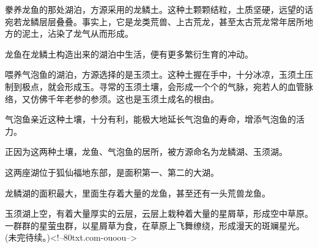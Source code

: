 \begin{this_body}
豢养龙鱼的那处湖泊，方源采用的龙鳞土。这种土颗颗结粒，土质坚硬，远望的话宛若龙鳞层层叠叠。事实上，它是龙类荒兽、上古荒龙，甚至太古荒龙常年居所地方的泥土，沾染了龙气从而形成。

龙鱼在龙鳞土构造出来的湖泊中生活，便有更多繁衍生育的冲动。

喂养气泡鱼的湖泊，方源选择的是玉须土。这种土握在手中，十分冰凉，玉须土压制到极点，就会形成玉。寻常的玉须土壤，会形成一个个的气脉，宛若人的血管脉络，又仿佛千年老参的参须。这也是玉须土成名的根由。

气泡鱼亲近这种土壤，十分有利，能极大地延长气泡鱼的寿命，增添气泡鱼的活力。

正因为这两种土壤，龙鱼、气泡鱼的居所，被方源命名为龙鳞湖、玉须湖。

这两座湖位于狐仙福地东部，是面积第一、第二的大湖。

龙鳞湖的面积最大，里面生存着大量的龙鱼，甚至还有一头荒兽龙鱼。

玉须湖上空，有着大量厚实的云层，云层上栽种着大量的星屑草，形成空中草原。一群群的星萤虫群，以星屑草为食，在草原上飞舞缭绕，形成漫天的斑斓星光。(未完待续。)<!--80txt.com-ouoou-->

\end{this_body}

